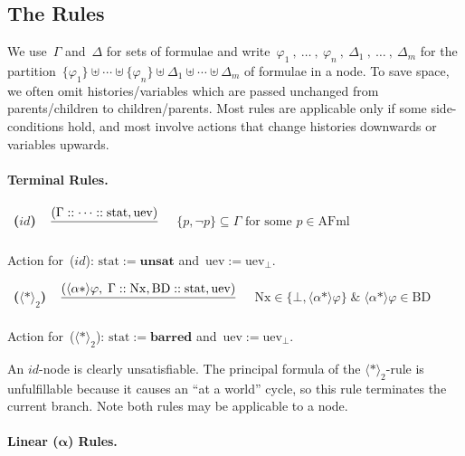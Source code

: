 \documentclass{entcs}
\newcommand{\xand}{\;\&\;}
\newcommand{\pnot}[1]{\lnot #1}
\newcommand{\pea}[2]{\langle#1\rangle #2}
\newcommand{\prp}[1]{#1*}
\newcommand{\proptn}{\mathrm{AFml}}
\newcommand{\tnode}[3]{(#1 :: #2 :: #3)}
\newcommand{\tnext}{\mathrm{Nx}}
\newcommand{\tbdia}{\mathrm{BD}}
\newcommand{\tmrk}{\mathrm{stat}}
\newcommand{\tuev}{\mathrm{uev}}
\newcommand{\talpha}{\boldsymbol{\alpha}}
\newcommand{\trid}{$id$}
\newcommand{\trert}{$\pea{\prp{}}{}_2$}
\newcommand{\ttrue}{\mathbf{unsat}}
\newcommand{\tloop}{\mathbf{barred}}
\newcommand{\ds}{\displaystyle\strut}
\newcommand{\ruleone}[3]{
\mbox{ {\bf #1} \ $\frac{\ds \mbox{$#2$}}{\ds \mbox{$#3$}}$}}
\begin{document}
\subsection{The Rules}

We use~$\Gamma$ and~$\Delta$ for sets of formulae
and write~$\varphi_1 \ , \ \dotsc \ , \ \varphi_n \ , \ \Delta_1 \ , \ \dotsc \ , \ \Delta_m$ for the
partition~$\{ \varphi_1 \} \uplus \dotsb \uplus \{ \varphi_n \} \uplus \Delta_1 \uplus \dotsb \uplus \Delta_m$ of formulae in a node.
To save space, we often omit histories/variables which are passed
unchanged from parents/children to children/parents.
Most rules are applicable only if some side-conditions hold,
and most involve actions that change histories downwards or variables upwards.

\paragraph{Terminal Rules.}

\begin{center}
  \ruleone{(\trid{})}
  {\tnode{\Gamma}{\dotsb}{\tmrk, \tuev}}{}
  $\quad \{ p, \pnot{p} \} \subseteq \Gamma \text{ for some } p \in \proptn$
\end{center}
Action for~(\trid{}): $\tmrk := \ttrue$ and~$\tuev := \tuev_{\bot}$.
\begin{center}
  \ruleone{(\trert{})}
  {\tnode{\pea{\prp{\alpha}}{\varphi} , \; \Gamma}{\tnext, \tbdia}{\tmrk, \tuev}}{}
  $\quad \tnext \in \{ \bot, \pea{\prp{\alpha}}{\varphi} \} \xand \pea{\prp{\alpha}}{\varphi} \in \tbdia$
\end{center}
Action for~(\trert{}): $\tmrk := \tloop$ and~$\tuev := \tuev_{\bot}$.

An \trid{}-node is clearly unsatisfiable.
The principal formula of the \trert{}-rule is unfulfillable
because it causes an ``at a world'' cycle,
so this rule terminates the current branch. Note both rules may be
applicable to a node.

\paragraph{Linear ($\talpha$) Rules.}
\end{document}
